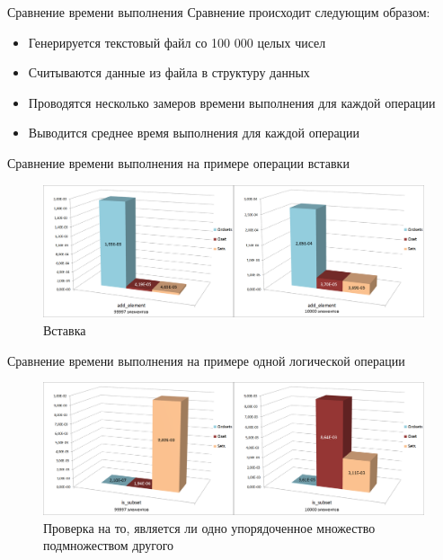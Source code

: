 \documentclass{beamer}
\begin{document}
\begin{frame}{Сравнение времени выполнения}
	Сравнение происходит следующим образом:
	\begin{itemize}
		\item Генерируется текстовый файл со 100 000 целых чисел
		\item Считываются данные из файла в структуру данных
		\item Проводятся несколько замеров времени выполнения для каждой операции
		\item Выводится среднее время выполнения для каждой операции
	\end{itemize}
\end{frame}
	
\begin{frame}{Сравнение времени выполнения на примере операции вставки}
	\begin{figure}
		\includegraphics[scale=0.18]{img/histograms/add_element.png}
		\caption{Вставка}
	\end{figure}
\end{frame}
	
	
\begin{frame}{Сравнение времени выполнения на примере одной логической операции}				
	\begin{figure}
		\includegraphics[scale=0.18]{img/histograms/is_subset.png}
		\caption{Проверка на то, является ли одно упорядоченное множество подмножеством другого}
	\end{figure}
\end{frame}
	
\end{document}
